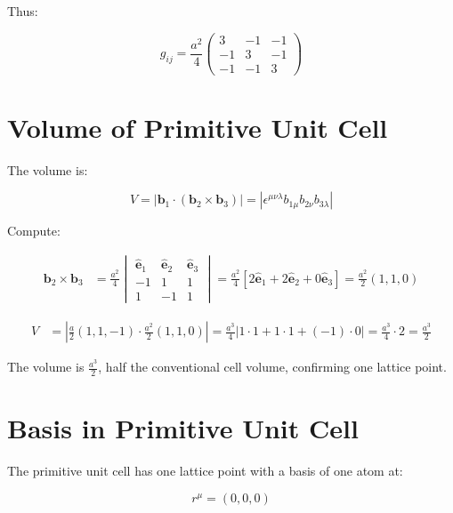 \documentclass[a4paper,12pt]{article}
\newcommand{\bvec}[1]{\mathbf{#1}} %
\newcommand{\eps}{\epsilon} %
\begin{document}
	Thus:
	
	\begin{equation}
		g_{ij} = \frac{a^2}{4} \begin{pmatrix}
			3 & -1 & -1 \\
			-1 & 3 & -1 \\
			-1 & -1 & 3
		\end{pmatrix}
	\end{equation}
	
	\section{Volume of Primitive Unit Cell}
	
	The volume is:
	
	\begin{equation}
		V = |\bvec{b}_1 \cdot (\bvec{b}_2 \times \bvec{b}_3)| = |\eps^{\mu\nu\lambda} b_{1\mu} b_{2\nu} b_{3\lambda}|
	\end{equation}
	
	Compute:
	
	\begin{align}
		\bvec{b}_2 \times \bvec{b}_3 &= \frac{a^2}{4} \begin{vmatrix}
			\hat{\bvec{e}}_1 & \hat{\bvec{e}}_2 & \hat{\bvec{e}}_3 \\
			-1 & 1 & 1 \\
			1 & -1 & 1
		\end{vmatrix} = \frac{a^2}{4} [2 \hat{\bvec{e}}_1 + 2 \hat{\bvec{e}}_2 + 0 \hat{\bvec{e}}_3] = \frac{a^2}{2} (1, 1, 0)
	\end{align}
	
	\begin{align}
		V &= \left| \frac{a}{2} (1, 1, -1) \cdot \frac{a^2}{2} (1, 1, 0) \right| = \frac{a^3}{4} |1 \cdot 1 + 1 \cdot 1 + (-1) \cdot 0| = \frac{a^3}{4} \cdot 2 = \frac{a^3}{2}
	\end{align}
	
	The volume is \(\frac{a^3}{2}\), half the conventional cell volume, confirming one lattice point.
	
	\section{Basis in Primitive Unit Cell}
	
	The primitive unit cell has one lattice point with a basis of one atom at:
	
	\begin{equation}
		r^\mu = (0, 0, 0)
	\end{equation}
	
\end{document}
